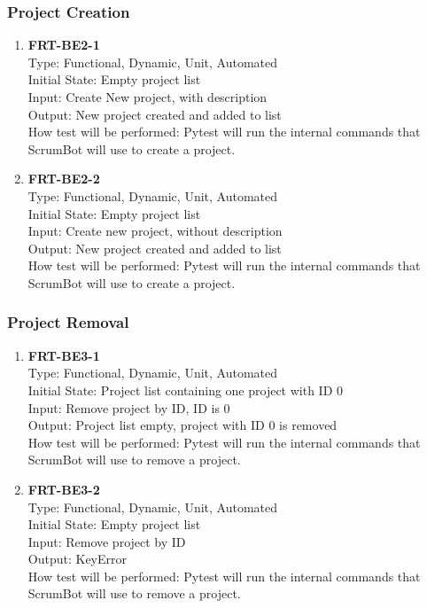 \documentclass[12pt, titlepage]{article}
\begin{document}
\subsubsection{Project Creation}
\begin{enumerate}
    \item{\textbf{FRT-BE2-1}}\\
    Type: Functional, Dynamic, Unit, Automated\\
    Initial State: Empty project list\\
    Input: Create New project, with description\\
    Output: New project created and added to list\\
    How test will be performed: Pytest will run the internal commands that ScrumBot will use to create a project.

    \item{\textbf{FRT-BE2-2}}\\
    Type: Functional, Dynamic, Unit, Automated\\
    Initial State: Empty project list\\
    Input: Create new project, without description\\
    Output: New project created and added to list\\
    How test will be performed: Pytest will run the internal commands that ScrumBot will use to create a project.
\end{enumerate}

\subsubsection{Project Removal}
\begin{enumerate}
    \item{\textbf{FRT-BE3-1}}\\
    Type: Functional, Dynamic, Unit, Automated\\
    Initial State: Project list containing one project with ID 0\\
    Input: Remove project by ID, ID is 0\\
    Output: Project list empty, project with ID 0 is removed\\
    How test will be performed: Pytest will run the internal commands that ScrumBot will use to remove a project.

    \item{\textbf{FRT-BE3-2}}\\
    Type: Functional, Dynamic, Unit, Automated\\
    Initial State: Empty project list\\
    Input: Remove project by ID\\
    Output: KeyError\\
    How test will be performed: Pytest will run the internal commands that ScrumBot will use to remove a project.
\end{enumerate}
\end{document}
